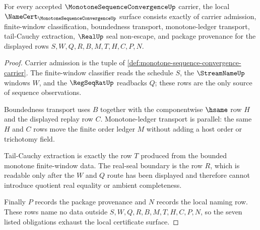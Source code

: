 \begin{theorem}
\label{thm:monotone-sequence-convergence-namecert-obligations}
For every accepted $\MonotoneSequenceConvergenceUp$ carrier, the local $\NameCert_{\MonotoneSequenceConvergenceUp}$ surface consists exactly of carrier admission, finite-window classification, boundedness transport, monotone-ledger transport, tail-Cauchy extraction, $\RealUp$ seal non-escape, and package provenance for the displayed rows $S,W,Q,R,B,M,T,H,C,P,N$.
\end{theorem}
\begin{proof}
Carrier admission is the tuple of \autoref{def:monotone-sequence-convergence-carrier}. The finite-window classifier reads the schedule $S$, the $\StreamNameUp$ windows $W$, and the $\RegSeqRatUp$ readbacks $Q$; these rows are the only source of sequence observations.

Boundedness transport uses $B$ together with the componentwise $\hsame$ row $H$ and the displayed replay row $C$. Monotone-ledger transport is parallel: the same $H$ and $C$ rows move the finite order ledger $M$ without adding a host order or trichotomy field.

Tail-Cauchy extraction is exactly the row $T$ produced from the bounded monotone finite-window data. The real-seal boundary is the row $R$, which is readable only after the $W$ and $Q$ route has been displayed and therefore cannot introduce quotient real equality or ambient completeness.

Finally $P$ records the package provenance and $N$ records the local naming row. These rows name no data outside $S,W,Q,R,B,M,T,H,C,P,N$, so the seven listed obligations exhaust the local certificate surface.
\end{proof}



